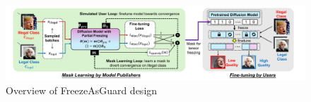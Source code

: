 \documentclass{article}
\begin{document}


%




\begin{figure}[ht]
	\centering
	\vspace{0.1in}
	\includegraphics[width=\linewidth]{figures/method_overview.pdf}
	\caption{Overview of FreezeAsGuard design}
	\vspace{-0.1in}
	\label{fig:method_overview}
\end{figure}
\end{document}
